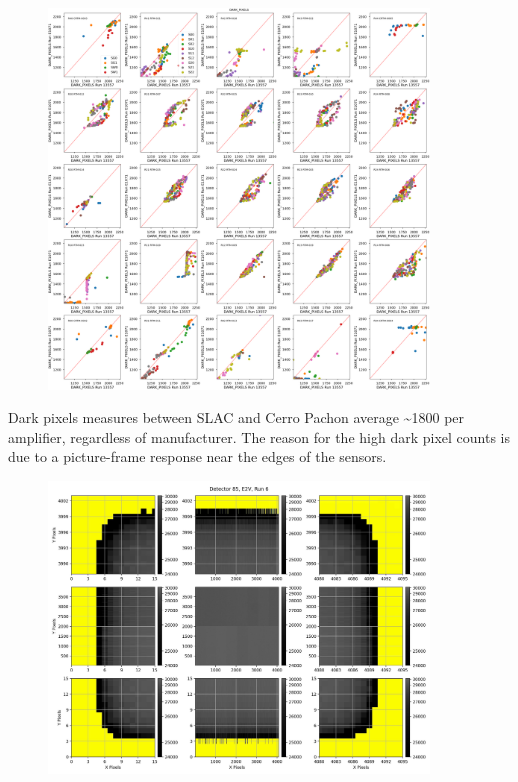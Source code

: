 \begin{figure}
\begin{centering}
\includegraphics[width=0.9\textwidth]{sections/figures/baselineCharacterization/13557_E1071_DARK_PIXELS.png}
\end{centering}
\end{figure}

Dark pixels measures between SLAC and Cerro Pachon average
\textasciitilde1800 per amplifier, regardless of manufacturer. The
reason for the high dark pixel counts is due to a picture-frame response
near the edges of the sensors.

\begin{figure}
\begin{centering}
\includegraphics[width=0.9\textwidth]{sections/figures/baselineCharacterization/detector_85.jpg}
\end{centering}
\end{figure}

